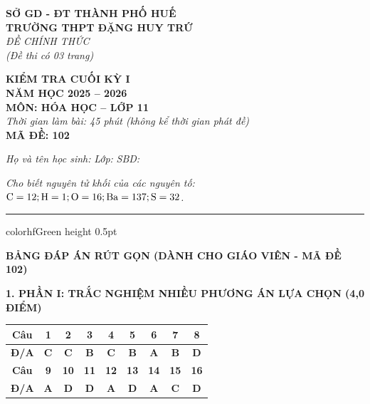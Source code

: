 \documentclass[11pt,a4paper]{article}
\begin{document}
\begin{minipage}[t]{0.48\textwidth}
\textbf{SỞ GD - ĐT THÀNH PHỐ HUẾ}\\
\textbf{TRƯỜNG THPT ĐẶNG HUY TRỨ}\\
\textit{ĐỀ CHÍNH THỨC}\\
\textit{(Đề thi có 03 trang)}
\end{minipage}
\hfill
\begin{minipage}[t]{0.48\textwidth}
\raggedleft
\textbf{\color{hfRed}KIỂM TRA CUỐI KỲ I}\\
\textbf{NĂM HỌC 2025 -- 2026}\\
\textbf{MÔN: HÓA HỌC -- LỚP 11}\\
\textit{Thời gian làm bài: 45 phút (không kể thời gian phát đề)}\\
\textbf{MÃ ĐỀ: 102}
\end{minipage}

\vspace{4pt}
\noindent
\textit{Họ và tên học sinh:} \dotfill \textit{Lớp:} \dotfill \textit{SBD:} \dotfill

\vspace{3pt}
\noindent
\textit{\footnotesize Cho biết nguyên tử khối của các nguyên tố: $\ce{C} = 12; \ce{H} = 1; \ce{O} = 16; \ce{Ba} = 137; \ce{S} = 32$.}

\vspace{3pt}
\hrule color{hfGreen} height 0.5pt

\vspace{6pt}
\begin{center}
{\large\bfseries\color{hfRed} BẢNG ĐÁP ÁN RÚT GỌN (DÀNH CHO GIÁO VIÊN - MÃ ĐỀ 102)}
\end{center}

\vspace{4pt}
{\bfseries\color{mainGreen} 1. PHẦN I: TRẮC NGHIỆM NHIỀU PHƯƠNG ÁN LỰA CHỌN (4,0 ĐIỂM)}

\vspace{2pt}
\begin{center}
\renewcommand{\arraystretch}{1.2}
\begin{tabular}{|c|c|c|c|c|c|c|c|c|}
\hline
\rowcolor{tableGreen}
\textbf{Câu} & \textbf{1} & \textbf{2} & \textbf{3} & \textbf{4} & \textbf{5} & \textbf{6} & \textbf{7} & \textbf{8} \\ \hline
\textbf{Đ/A} & \textbf{\color{hfRed}C} & \textbf{\color{hfRed}C} & \textbf{\color{hfRed}B} & \textbf{\color{hfRed}C} & \textbf{\color{hfRed}B} & \textbf{\color{hfRed}A} & \textbf{\color{hfRed}B} & \textbf{\color{hfRed}D} \\ \hline
\rowcolor{tableGreen}
\textbf{Câu} & \textbf{9} & \textbf{10} & \textbf{11} & \textbf{12} & \textbf{13} & \textbf{14} & \textbf{15} & \textbf{16} \\ \hline
\textbf{Đ/A} & \textbf{\color{hfRed}A} & \textbf{\color{hfRed}D} & \textbf{\color{hfRed}D} & \textbf{\color{hfRed}A} & \textbf{\color{hfRed}D} & \textbf{\color{hfRed}A} & \textbf{\color{hfRed}C} & \textbf{\color{hfRed}D} \\ \hline
\end{tabular}
\end{center}
\end{document}
